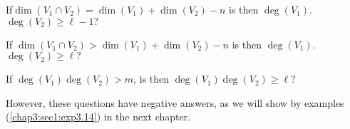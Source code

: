 \begin{question}\label{chap2:sec6:qus1}%
  If\pageoriginale $\dim (V_1\cap V_2) = \dim (V_1) + \dim (V_2) -n$
  is then $\deg  (V_1)$. $\deg (V_2) \geq \ell -1?$  
\end{question}

\begin{question}\label{chap2:sec6:qus2}%
  If $\dim (V_1\cap V_2) > \dim (V_1) + \dim (V_2) - n$ is then $\deg
  (V_1)$. $\deg (V_2) \geq \ell ?$ 
\end{question}

\begin{question}\label{chap2:sec6:qus3}%
  If $\deg (V_1) \deg{(V_2) > m}$, is then $\deg (V_1) \deg (V_2) \geq \ell?$
\end{question}
 
However, these questions have negative answers, as we will show by
examples (\ref{chap3:sec1:exp3.14}) in the next chapter. 
